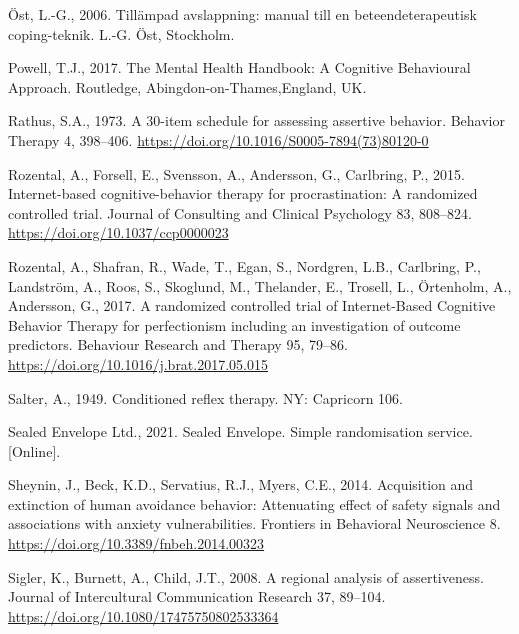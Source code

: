 \documentclass[preprint,
3p]{elsarticle} %
\newlength{\cslhangindent}
\newlength{\cslentryspacingunit} %
\newenvironment{CSLReferences}[2] %
 {%
  \setlength{\parindent}{0pt}
  \ifodd #1
  \let\oldpar\par
  \def\par{\hangindent=\cslhangindent\oldpar}
  \fi
  \setlength{\parskip}{#2\cslentryspacingunit}
 }%
 {}
\begin{document}
\begin{CSLReferences}{1}{0}
\leavevmode{}%
Öst, L.-G., 2006. {Till{ä}mpad avslappning: manual till en
beteendeterapeutisk coping-teknik}. L.-G. {Ö}st, Stockholm.

\leavevmode{}%
Powell, T.J., 2017. {The Mental Health Handbook: A Cognitive Behavioural
Approach}. Routledge, Abingdon-on-Thames,England, UK.

\leavevmode{}%
Rathus, S.A., 1973. {A 30-item schedule for assessing assertive
behavior}. Behavior Therapy 4, 398--406.
\url{https://doi.org/10.1016/S0005-7894(73)80120-0}

\leavevmode{}%
Rozental, A., Forsell, E., Svensson, A., Andersson, G., Carlbring, P.,
2015. {Internet-based cognitive-behavior therapy for procrastination: A
randomized controlled trial}. Journal of Consulting and Clinical
Psychology 83, 808--824. \url{https://doi.org/10.1037/ccp0000023}

\leavevmode{}%
Rozental, A., Shafran, R., Wade, T., Egan, S., Nordgren, L.B.,
Carlbring, P., Landström, A., Roos, S., Skoglund, M., Thelander, E.,
Trosell, L., Örtenholm, A., Andersson, G., 2017. {A randomized
controlled trial of Internet-Based Cognitive Behavior Therapy for
perfectionism including an investigation of outcome predictors}.
Behaviour Research and Therapy 95, 79--86.
\url{https://doi.org/10.1016/j.brat.2017.05.015}

\leavevmode{}%
Salter, A., 1949. {Conditioned reflex therapy}. NY: Capricorn 106.

\leavevmode{}%
Sealed Envelope Ltd., 2021. {Sealed Envelope. Simple randomisation
service. {[}Online{]}}.

\leavevmode{}%
Sheynin, J., Beck, K.D., Servatius, R.J., Myers, C.E., 2014. Acquisition
and extinction of human avoidance behavior: Attenuating effect of safety
signals and associations with anxiety vulnerabilities. Frontiers in
Behavioral Neuroscience 8.
\url{https://doi.org/10.3389/fnbeh.2014.00323}

\leavevmode{}%
Sigler, K., Burnett, A., Child, J.T., 2008. A regional analysis of
assertiveness. Journal of Intercultural Communication Research 37,
89--104. \url{https://doi.org/10.1080/17475750802533364}


\end{CSLReferences}
\end{document}
